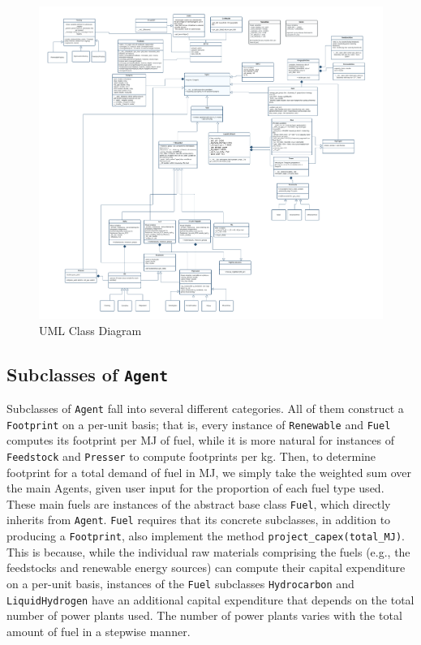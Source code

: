 \documentclass{article}
\begin{document}
\begin{figure}[H]
    \centering
    \includegraphics[width=1\textwidth]{figures/UML 3.0.jpeg}
    \caption{UML Class Diagram}
    \label{fig:UML}
\end{figure}

\subsection*{Subclasses of \texttt{Agent}}
Subclasses of \texttt{Agent} fall into several different categories. All of them construct a \texttt{Footprint} on a per-unit basis; that is, every instance of \texttt{Renewable} and \texttt{Fuel} computes its footprint per MJ of fuel, while it is more natural for instances of \texttt{Feedstock} and \texttt{Presser} to compute footprints per kg. Then, to determine footprint for a total demand of fuel in MJ, we simply take the weighted sum over the main Agents, given user input for the proportion of each fuel type used. These main fuels are instances of the abstract base class \texttt{Fuel}, which directly inherits from \texttt{Agent}. \texttt{Fuel} requires that its concrete subclasses, in addition to producing a \texttt{Footprint}, also implement the method \texttt{project\_capex(total\_MJ)}. This is because, while the individual raw materials comprising the fuels (e.g., the feedstocks and renewable energy sources) can compute their capital expenditure on a per-unit basis, instances of the \texttt{Fuel} subclasses \texttt{Hydrocarbon} and \texttt{LiquidHydrogen} have an additional capital expenditure that depends on the total number of power plants used. The number of power plants varies with the total amount of fuel in a stepwise manner.
\end{document}
